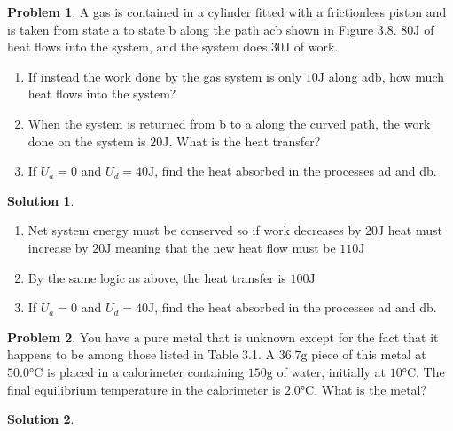 \documentclass[10pt]{article}
\theoremstyle{definition}
\newtheorem{problem}{Problem}
\newtheorem{soln}{Solution}
\begin{document}
\begin{problem}
A gas is contained in a cylinder fitted with a frictionless piston and is taken from state a to state b along the path acb shown in Figure 3.8.
$80\unit{\joule}$ of heat flows into the system, and the system does $30\unit{\joule}$ of work.
\begin{enumerate}[label=(\alph*)]
  \item If instead the work done by the gas system is only $10\unit{\joule}$ along adb, how much heat flows into the system?
  \item When the system is returned from b to a along the curved path, the work done on the system is $20\unit{\joule}$. What is the heat transfer?
  \item If $U_a = 0$ and $U_d = 40\unit{\joule}$, find the heat absorbed in the processes ad and db.
\end{enumerate}
\end{problem}
\begin{soln}~
  \begin{enumerate}[label=(\alph*)]
    \item Net system energy must be conserved so if work decreases by $20\unit{\joule}$ heat must increase by $20\unit{\joule}$ meaning that the new heat flow must be $110\unit{\joule}$
    \item By the same logic as above, the heat transfer is $100\unit{\joule}$
    \item If $U_a = 0$ and $U_d = 40\unit{\joule}$, find the heat absorbed in the processes ad and db.
  \end{enumerate}
\end{soln}

\begin{problem}
You have a pure metal that is unknown except for the fact that it happens to be among those listed in Table 3.1. A $36.7\unit{\gram}$ piece of this metal
at $50.0\unit{\celsius}$ is placed in a calorimeter containing $150\unit{\gram}$ of water, initially at $10\unit{\celsius}$. The final equilibrium temperature in the calorimeter is $2.0\unit{\celsius}$.
What is the metal?
\end{problem}
\begin{soln}
\end{soln}
\end{document}
